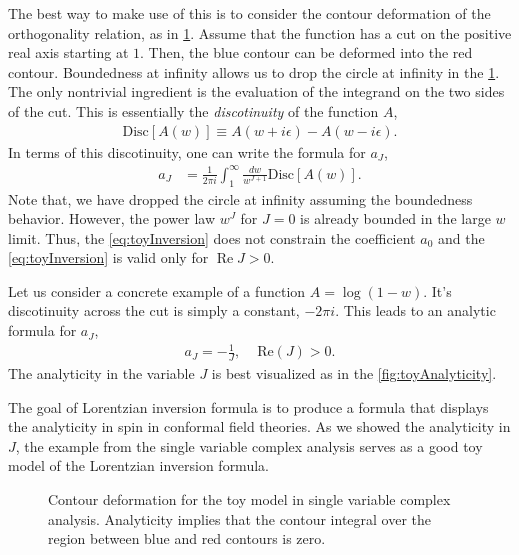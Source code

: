 The best way to make use of this is to consider the contour deformation of the orthogonality relation, as in \cref{fig:wcontourdeformatoin}.
Assume that the function has a cut on the positive real axis starting at $ 1 $.
Then, the blue contour can be deformed into the red contour.
Boundedness at infinity allows us to drop the circle at infinity in the \cref{fig:wcontourdeformatoin}.
The only nontrivial ingredient is the evaluation of the integrand on the two sides of the cut.
This is essentially the \emph{discotinuity} of the function $ A $,
\begin{align}
  \text{Disc}\left[ A\left( w \right) \right] \equiv A\left( w + i \epsilon \right) - A\left( w - i \epsilon \right)
  .\end{align}
In terms of this discotinuity, one can write the formula for $ a_J $,
\begin{align}
  a_J & = \frac{1}{2\pi i } \int_{1}^{\infty}\frac{dw }{w^{J+1}} \text{Disc} \left[ A\left( w \right) \right]
  \label{eq:toyInversion}
  .\end{align}
Note that, we have dropped the circle at infinity assuming the boundedness behavior.
However, the power law $ w^{J} $ for $ J = 0  $ is already bounded in the large $ w $ limit.
Thus, the \cref{eq:toyInversion} does not constrain the coefficient $ a_0 $ and the \cref{eq:toyInversion} is valid only for $ \operatorname*{Re} J > 0 $.

Let us consider a concrete example of a function $ A = \log \left( 1-w \right) $.
It's discotinuity across the cut is simply a constant, $ -2 \pi i $.
This leads to an analytic formula for $ a_J $,
\begin{align}
  a_J  = -\frac{1}{J}, & \, \, \text{Re} \left( J \right) >0
  .\end{align}
The analyticity in the variable $ J $ is best visualized as in the \cref{fig:toyAnalyticity}.

The goal of Lorentzian inversion formula is to produce a formula that displays the analyticity in spin in conformal field theories.
As we showed the analyticity in $ J $, the example from the single variable complex analysis serves as a good toy model of the Lorentzian inversion formula.


\begin{figure}[t!]
  \centering
  \caption{Contour deformation for the toy model in single variable complex analysis. Analyticity implies that the contour integral over the region between blue and red contours is zero.}
  \label{fig:wcontourdeformatoin}
\end{figure}

